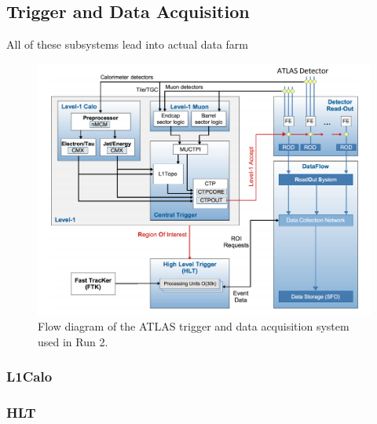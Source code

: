 \subsection{Trigger and Data Acquisition}
All of these subsystems lead into actual data farm
\begin{figure}[h!]
	\centering
	\includegraphics[width=\columnwidth]{../ThesisImages/LHCImages/ATLASTDAQR2.png}
	\caption[Flow diagram of the ATLAS trigger and data acquisition system used in Run 2.]{Flow diagram of the ATLAS trigger and data acquisition system used in Run 2.\cite{ATLASTDAQ}
	}
	\label{fig:ATLAStdaq}
\end{figure}

\subsubsection{L1Calo}
\subsubsection{HLT}


